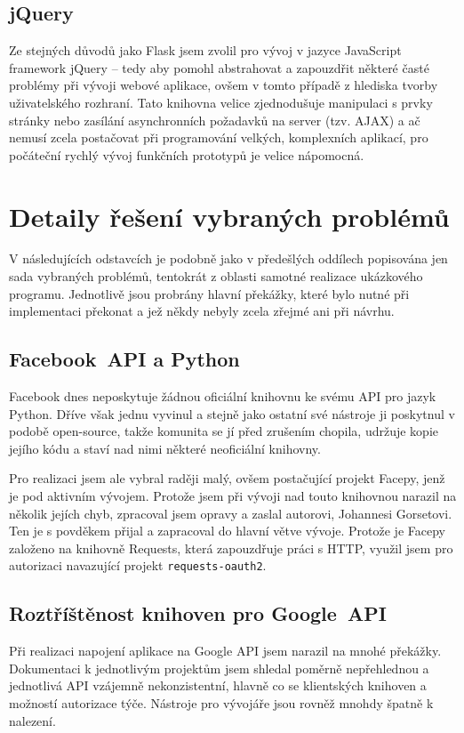 \documentclass[12pt,oneside,final]{fithesis2}
\begin{document}
\subsection{jQuery}
Ze stejných důvodů jako Flask jsem zvolil pro vývoj v jazyce JavaScript framework jQuery -- tedy aby pomohl abstrahovat a zapouzdřit některé časté problémy při vývoji webové aplikace, ovšem v tomto případě z hlediska tvorby uživatelského rozhraní. Tato knihovna velice zjednodušuje manipulaci s prvky stránky nebo zasílání asynchronních požadavků na server (tzv. AJAX) a ač nemusí zcela postačovat při programování velkých, komplexních aplikací, pro počáteční rychlý vývoj funkčních prototypů je velice nápomocná.


\section{Detaily řešení vybraných problémů}
V následujících odstavcích je podobně jako v předešlých oddílech popisována jen sada vybraných problémů, tentokrát z oblasti samotné realizace ukázkového programu. Jednotlivě jsou probrány hlavní překážky, které bylo nutné při implementaci překonat a jež někdy nebyly zcela zřejmé ani při návrhu.

\subsection{Facebook~API a Python}
Facebook dnes neposkytuje žádnou oficiální knihovnu ke svému API pro jazyk Python. Dříve však jednu vyvinul a stejně jako ostatní své nástroje ji poskytnul v podobě open-source, takže komunita se jí před zrušením chopila, udržuje kopie jejího kódu a staví nad nimi některé neoficiální knihovny.

Pro realizaci jsem ale vybral raději malý, ovšem postačující projekt Facepy, jenž je pod aktivním vývojem. Protože jsem při vývoji nad touto knihovnou narazil na několik jejích chyb, zpracoval jsem opravy a zaslal autorovi, Johannesi Gorsetovi. Ten je s povděkem přijal a zapracoval do hlavní větve vývoje. Protože je Facepy založeno na knihovně Requests, která zapouzdřuje práci s HTTP, využil jsem pro autorizaci navazující projekt {\tt requests-oauth2}.

\subsection{Roztříštěnost knihoven pro Google~API}
Při realizaci napojení aplikace na Google API jsem narazil na mnohé překážky. Dokumentaci k jednotlivým projektům jsem shledal poměrně nepřehlednou a jednotlivá API vzájemně nekonzistentní, hlavně co se klientských knihoven a možností autorizace týče. Nástroje pro vývojáře jsou rovněž mnohdy špatně k nalezení.
\end{document}
